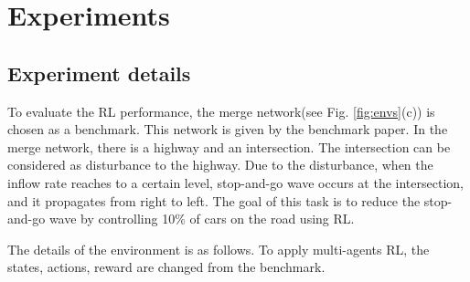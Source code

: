 \section{Experiments}\label{sec:experiments}

\subsection{Experiment details}

To evaluate the RL performance, the merge network(see Fig. \ref{fig:envs}(c)) is chosen as a benchmark. This network is given by the benchmark paper\cite{Vinitsky2018}. In the merge network, there is a highway and an intersection. The intersection can be considered as disturbance to the highway. Due to the disturbance, when the inflow rate reaches to a certain level, stop-and-go wave occurs at the intersection, and it propagates from right to left. The goal of this task is to reduce the stop-and-go wave by controlling 10\% of cars on the road using RL. 

The details of the environment is as follows. To apply multi-agents RL, the states, actions, reward are changed from the benchmark.

